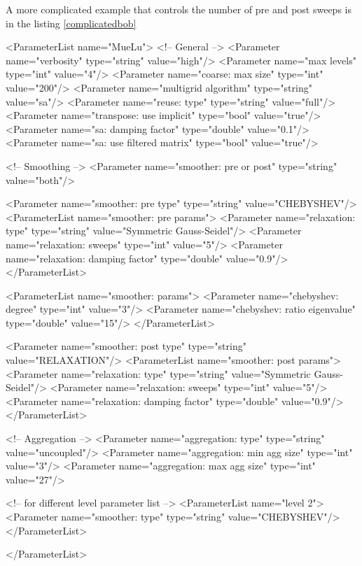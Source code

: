 A more complicated example that controls the number of pre and post sweeps is in the listing \ref{complicatedbob}
\begin{python}[caption=complicatedbob.xml,label=complicatedbob]
<ParameterList name="MueLu">
  <!--    General    -->
  <Parameter name="verbosity"               type="string"    value="high"/> 
  <Parameter name="max levels"              type="int"       value="4"/>
  <Parameter name="coarse: max size"        type="int"       value="200"/>
  <Parameter name="multigrid algorithm"     type="string"    value="sa"/>
  <Parameter name="reuse: type"             type="string"    value="full"/>
  <Parameter name="transpose: use implicit" type="bool"      value="true"/>
  <Parameter name="sa: damping factor"      type="double"    value="0.1"/> 
  <Parameter name="sa: use filtered matrix" type="bool"      value="true"/>

  <!-- Smoothing -->
  <Parameter name="smoother: pre or post"        type="string"  value="both"/>

  <Parameter name="smoother: pre type"           type="string"  value="CHEBYSHEV"/>
  <ParameterList name="smoother: pre params">
    <Parameter name="relaxation: type"           type="string"  value="Symmetric Gauss-Seidel"/>
    <Parameter name="relaxation: sweeps"         type="int"     value="5"/>
    <Parameter name="relaxation: damping factor" type="double"  value="0.9"/>
  </ParameterList>
  
  <ParameterList name="smoother: params">
    <Parameter name="chebyshev: degree"           type="int"     value="3"/>
    <Parameter name="chebyshev: ratio eigenvalue" type="double"  value="15"/>
  </ParameterList>

  <Parameter name="smoother: post type"           type="string"  value="RELAXATION"/>
  <ParameterList name="smoother: post params">
    <Parameter name="relaxation: type"           type="string"  value="Symmetric Gauss-Seidel"/>
    <Parameter name="relaxation: sweeps"         type="int"     value="5"/>
    <Parameter name="relaxation: damping factor" type="double"  value="0.9"/>
  </ParameterList>

  <!-- Aggregation -->
  <Parameter name="aggregation: type"           type="string"  value="uncoupled"/>
  <Parameter name="aggregation: min agg size"   type="int"     value="3"/>
  <Parameter name="aggregation: max agg size"   type="int"     value="27"/>

  <!--  for different level parameter list -->
  <ParameterList name="level 2">
    <Parameter name="smoother: type" type="string" value="CHEBYSHEV"/>
  </ParameterList>

</ParameterList>
\end{python}

